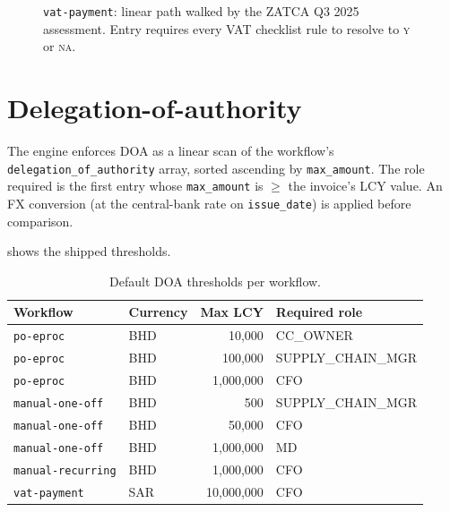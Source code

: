 \begin{figure}[htbp]
\centering
{}
\caption{\texttt{vat-payment}: linear path walked by the ZATCA Q3
2025 assessment. Entry requires every VAT checklist rule to resolve
to \textsc{y} or \textsc{na}.}
\label{fig:vat-payment}
\end{figure}

\section{Delegation-of-authority}

The engine enforces DOA as a linear scan of the workflow's
\texttt{delegation\_of\_authority} array, sorted ascending by
\texttt{max\_amount}. The role required is the first entry whose
\texttt{max\_amount} is $\geq$ the invoice's LCY value. An FX
conversion (at the central-bank rate on \texttt{issue\_date}) is
applied before comparison.

 shows the shipped thresholds.

\begin{table}[htbp]
\centering
\caption{Default DOA thresholds per workflow.}
\label{tab:doa}
\small
\begin{tabularx}{\linewidth}{@{}l l r l@{}}
\toprule
\textbf{Workflow} & \textbf{Currency} & \textbf{Max LCY} & \textbf{Required role} \\ \midrule
\texttt{po-eproc}        & BHD &    10{,}000 & CC\_OWNER \\
\texttt{po-eproc}        & BHD &   100{,}000 & SUPPLY\_CHAIN\_MGR \\
\texttt{po-eproc}        & BHD & 1{,}000{,}000 & CFO \\
\texttt{manual-one-off}  & BHD &      500 & SUPPLY\_CHAIN\_MGR \\
\texttt{manual-one-off}  & BHD &   50{,}000 & CFO \\
\texttt{manual-one-off}  & BHD & 1{,}000{,}000 & MD \\
\texttt{manual-recurring}& BHD & 1{,}000{,}000 & CFO \\
\texttt{vat-payment}     & SAR & 10{,}000{,}000 & CFO \\
\bottomrule
\end{tabularx}
\end{table}

